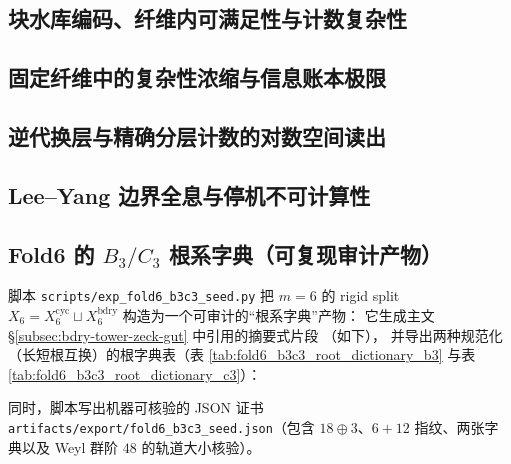 \subsection{块水库编码、纤维内可满足性与计数复杂性}\label{subsec:fold-computability-block-foldsat}


\subsection{固定纤维中的复杂性浓缩与信息账本极限}\label{subsec:fold-computability-fixed-fiber-ledger-complexity}


\subsection{逆代换层与精确分层计数的对数空间读出}\label{subsec:fold-computability-fiber-level-count-logspace}


\subsection{Lee--Yang 边界全息与停机不可计算性}\label{subsec:fold-computability-leyang-halting-holography}


\subsection{Fold6 的 \texorpdfstring{$B_3/C_3$}{B3/C3} 根系字典（可复现审计产物）}
\label{app:fold6-b3c3-seed-dictionary}

脚本 \texttt{scripts/exp\_fold6\_b3c3\_seed.py} 把 \(m=6\) 的 rigid split
\(
X_6=X_6^{\mathrm{cyc}}\sqcup X_6^{\mathrm{bdry}}
\)
构造为一个可审计的“根系字典”产物：
它生成主文 \S\ref{subsec:bdry-tower-zeck-gut} 中引用的摘要式片段
\verb||（如下），
并导出两种规范化（长短根互换）的根字典表（表 \ref{tab:fold6_b3c3_root_dictionary_b3} 与表 \ref{tab:fold6_b3c3_root_dictionary_c3}）：






同时，脚本写出机器可核验的 JSON 证书 \texttt{artifacts/export/fold6\_b3c3\_seed.json}（包含 \(18\oplus 3\)、\(6+12\) 指纹、两张字典以及 Weyl 群阶 \(48\) 的轨道大小核验）。
